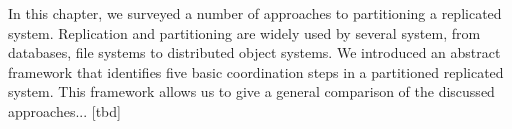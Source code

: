 In this chapter, we surveyed a number of approaches to partitioning a replicated
system. Replication and partitioning are widely used by several system, from
databases, file systems to distributed object systems. We introduced an abstract
framework that identifies five basic coordination steps in a partitioned
replicated system. This framework allows us to give a general comparison of the
discussed approaches... [tbd]





















